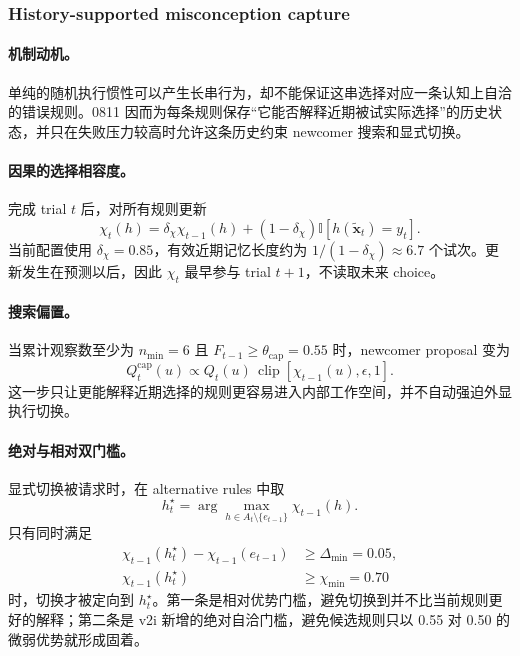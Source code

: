 \subsubsection{History-supported misconception capture}

\paragraph{机制动机。}
单纯的随机执行惯性可以产生长串行为，却不能保证这串选择对应一条认知上自洽的错误规则。0811 因而为每条规则保存“它能否解释近期被试实际选择”的历史状态，并只在失败压力较高时允许这条历史约束 newcomer 搜索和显式切换。

\paragraph{因果的选择相容度。}
完成 trial $t$ 后，对所有规则更新
\begin{equation}
\chi_t(h)
=\delta_\chi\chi_{t-1}(h)
+(1-\delta_\chi)
\mathbb I\!\left[
h(\widetilde{\mathbf x}_t)=y_t
\right].
\label{eq:model0811-choice-compatibility}
\end{equation}
当前配置使用 $\delta_\chi=0.85$，有效近期记忆长度约为
$1/(1-\delta_\chi)\approx6.7$ 个试次。更新发生在预测以后，因此 $\chi_t$ 最早参与 trial $t+1$，不读取未来 choice。

\paragraph{搜索偏置。}
当累计观察数至少为 $n_{\min}=6$ 且
$F_{t-1}\ge\theta_{\mathrm{cap}}=0.55$ 时，newcomer proposal 变为
\begin{equation}
Q_t^{\mathrm{cap}}(u)
\propto Q_t(u)\,
\operatorname{clip}\!\left[\chi_{t-1}(u),\epsilon,1\right].
\label{eq:model0811-capture-search}
\end{equation}
这一步只让更能解释近期选择的规则更容易进入内部工作空间，并不自动强迫外显执行切换。

\paragraph{绝对与相对双门槛。}
显式切换被请求时，在 alternative rules 中取
\begin{equation}
h_t^\star
=\arg\max_{h\in A_t\setminus\{e_{t-1}\}}
\chi_{t-1}(h).
\label{eq:model0811-capture-target}
\end{equation}
只有同时满足
\begin{align}
\chi_{t-1}(h_t^\star)-\chi_{t-1}(e_{t-1})
&\ge\Delta_{\min}=0.05,
\nonumber\\
\chi_{t-1}(h_t^\star)
&\ge\chi_{\min}=0.70
\label{eq:model0811-capture-gates}
\end{align}
时，切换才被定向到 $h_t^\star$。第一条是相对优势门槛，避免切换到并不比当前规则更好的解释；第二条是 v2i 新增的绝对自洽门槛，避免候选规则只以 0.55 对 0.50 的微弱优势就形成固着。

